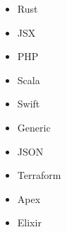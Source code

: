 \documentclass[preview]{standalone}
\begin{document}
\begin{center}
\begin{itemize}
                                \item Rust
                                \item JSX
                                \item PHP
                                \item Scala
                                \item Swift
                                \item Generic
                                \item JSON
                                \item Terraform
                                \item Apex
                                \item Elixir
                            \end{itemize}
\end{center}
\end{document}
